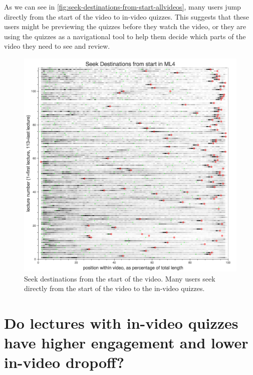 \documentclass{sigchi}
\begin{document}
As we can see in \autoref{fig:seek-destinations-from-start-allvideos}, many users jump directly from the start of the video to in-video quizzes. This suggests that these users might be previewing the quizzes before they watch the video, or they are using the quizzes as a navigational tool to help them decide which parts of the video they need to see and review.

\begin{figure}
\includegraphics[width=1.0\columnwidth]{seek-destinations-from-start-allvideos}
\caption{Seek destinations from the start of the video. Many users seek directly from the start of the video to the in-video quizzes.}
\label{fig:seek-destinations-from-start-allvideos}
\end{figure}


\pagebreak

\section{Do lectures with in-video quizzes have higher engagement and lower in-video dropoff?}
\end{document}
